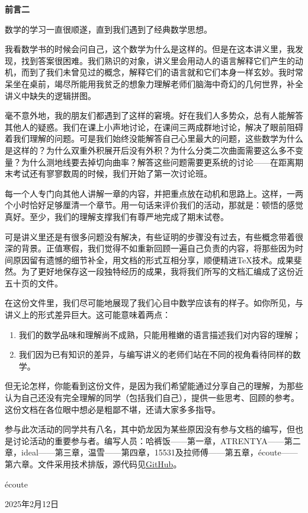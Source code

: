 \documentclass{main}
\theoremstyle{definition}
\newenvironment{preface}[1][前言]{
    \newpage
    \vspace*{\stretch{2}}
    {\noindent \bfseries \Huge #1}
    \begin{center}
        \phantomsection \addcontentsline{toc}{chapter}{#1}
        \thispagestyle{plain}
    \end{center}

}
{\vspace*{\stretch{5}}}
\begin{document}
\begin{preface}[前言二]
    数学的学习一直很顺遂，直到我们遇到了经典数学思想。

    我看数学书的时候会问自己，这个数学为什么是这样的。但是在\cite{cmt}这本讲义里，我发现，找到答案很困难。我们熟识的对象，讲义里会用动人的语言解释它们产生的动机，而到了我们未曾见过的概念，解释它们的语言就和它们本身一样玄妙。我时常呆坐在桌前，竭尽所能用我贫乏的想象力理解老师们脑海中奇幻的几何世界，补全讲义中缺失的逻辑拼图。

    毫不意外地，我的朋友们都遇到了这样的窘境。好在我们人多势众，总有人能解答其他人的疑惑。我们在课上小声地讨论，在课间三两成群地讨论，解决了眼前阻碍着我们理解的问题。可是我们始终没能解答自己心里最大的问题，这些数学为什么是这样的？为什么双重外积展开后没有外积？为什么分类二次曲面需要这么多不变量？为什么测地线要去掉切向曲率？解答这些问题需要更系统的讨论——在距离期末考试还有寥寥数周的时候，我们开始了第一次讨论班。

    每一个人专门向其他人讲解一章的内容，并把重点放在动机和思路上。这样，一两个小时恰好足够厘清一个章节。用一句话来评价我们的活动，那就是：顿悟的感觉真好。至少，我们的理解支撑我们有尊严地完成了期末试卷。

    可是讲义里还是有很多问题没有解决，有些证明的步骤没有过去，有些概念带着很深的背景。正值寒假，我们觉得不如重新回顾一遍自己负责的内容，将那些因为时间原因留有遗憾的细节补全，用文档的形式互相分享，顺便精进\TeX 技术。成果斐然。为了更好地保存这一段独特经历的成果，我将我们所写的文档汇编成了这份近五十页的文件。

    在这份文件里，我们尽可能地展现了我们心目中数学应该有的样子。如你所见，与讲义上的形式差异巨大。这可能意味着两点：
    \begin{enumerate}
        \item 我们的数学品味和理解尚不成熟，只能用稚嫩的语言描述我们对内容的理解；
        \item 我们因为已有知识的差异，与编写讲义的老师们站在不同的视角看待同样的数学。
    \end{enumerate}
    但无论怎样，你能看到这份文件，是因为我们希望能通过分享自己的理解，为那些认为自己还没有完全理解的同学（包括我们自己），提供一些思考、回顾的参考。这份文档在各位眼中想必是粗鄙不堪，还请大家多多指导。

    参与此次活动的同学共有八名，其中奶龙因为某些原因没有参与文档的编写，但也是讨论活动的重要参与者。编写人员：哈裤饭——第一章，ATRENTYA——第二章，ideal——第三章，温雪——第四章，15531及拉师傅——第五章，\'ecoute——第六章。文件采用\LaTeXe 技术排版，源代码见\href{https://github.com/MrNullbody/classical-mathematical-thoughts}{GitHub}。
    \begin{flushright}
        \'ecoute

        2025年2月12日
    \end{flushright}
\end{preface}
\tableofcontents
\newpage
{}
\setcounter{page}{1}
\pagestyle{fancy}
\fancyhead[RO,LE]{\thepage}
\fancyhead[RE]{\rightmark}








\end{document}
